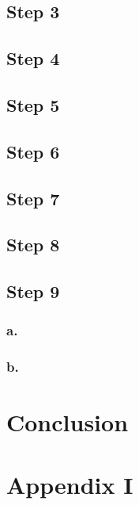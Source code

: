 \documentclass[letterpaper,12pt]{article}
\begin{document}
\subsection{Step 3}
\subsection{Step 4}
\subsection{Step 5}
\subsection{Step 6}
\subsection{Step 7}
\subsection{Step 8}
\subsection{Step 9}
\subsubsection{a.}
\subsubsection{b.}


\section{Conclusion}
\section{Appendix I}


\begin{thebibliography}{99}


\end{thebibliography}
\end{document}
